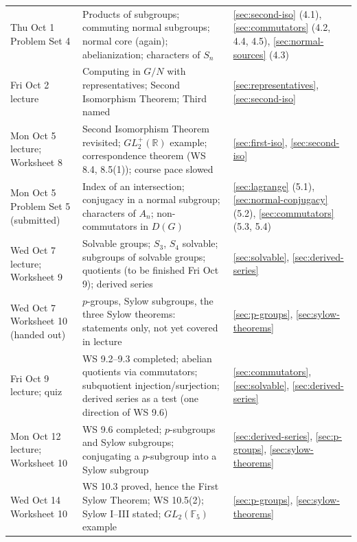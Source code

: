 \documentclass[11pt]{report}
\begin{document}
{\begin{longtable}{p{3.4cm}p{4.2cm}p{6.4cm}}
Thu Oct 1 \newline Problem Set 4 & Products of subgroups; commuting normal subgroups; normal core (again); abelianization; characters of $S_n$ & \ref{sec:second-iso} (4.1), \ref{sec:commutators} (4.2, 4.4, 4.5), \ref{sec:normal-sources} (4.3) \\
Fri Oct 2 \newline lecture & Computing in $G/N$ with representatives; Second Isomorphism Theorem; Third named & \ref{sec:representatives}, \ref{sec:second-iso} \\
Mon Oct 5 \newline lecture; Worksheet 8 & Second Isomorphism Theorem revisited; $GL_2^+(\mathbb{R})$ example; correspondence theorem (WS 8.4, 8.5(1)); course pace slowed & \ref{sec:first-iso}, \ref{sec:second-iso} \\
Mon Oct 5 \newline Problem Set 5 (submitted) & Index of an intersection; conjugacy in a normal subgroup; characters of $A_n$; non-commutators in $D(G)$ & \ref{sec:lagrange} (5.1), \ref{sec:normal-conjugacy} (5.2), \ref{sec:commutators} (5.3, 5.4) \\
Wed Oct 7 \newline lecture; Worksheet 9 & Solvable groups; $S_3$, $S_4$ solvable; subgroups of solvable groups; quotients (to be finished Fri Oct 9); derived series & \ref{sec:solvable}, \ref{sec:derived-series} \\
Wed Oct 7 \newline Worksheet 10 (handed out) & $p$-groups, Sylow subgroups, the three Sylow theorems: statements only, not yet covered in lecture & \ref{sec:p-groups}, \ref{sec:sylow-theorems} \\
Fri Oct 9 \newline lecture; quiz & WS 9.2--9.3 completed; abelian quotients via commutators; subquotient injection/surjection; derived series as a test (one direction of WS 9.6) & \ref{sec:commutators}, \ref{sec:solvable}, \ref{sec:derived-series} \\
Mon Oct 12 \newline lecture; Worksheet 10 & WS 9.6 completed; $p$-subgroups and Sylow subgroups; conjugating a $p$-subgroup into a Sylow subgroup & \ref{sec:derived-series}, \ref{sec:p-groups}, \ref{sec:sylow-theorems} \\
Wed Oct 14 \newline Worksheet 10 & WS 10.3 proved, hence the First Sylow Theorem; WS 10.5(2); Sylow I--III stated; $GL_2(\mathbb{F}_5)$ example & \ref{sec:p-groups}, \ref{sec:sylow-theorems} \\

\end{longtable}}
\end{document}
